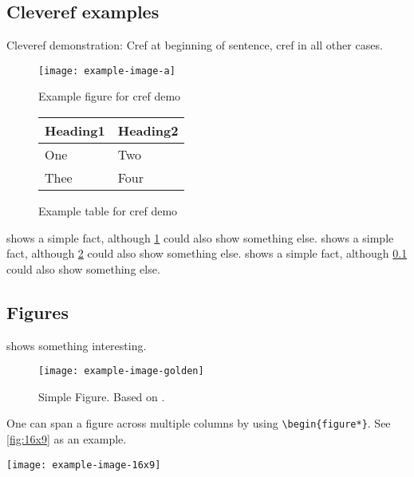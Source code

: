 \documentclass[peerreview,a4paper,english]{IEEEtran}[2015/08/26]
\begin{document}
\subsection{Cleveref examples}
\label{sec:ex:cref}
Cleveref demonstration: Cref at beginning of sentence, cref in all other cases.
\begin{figure}
    \centering
    \texttt{[image: example-image-a]}
    \caption{Example figure for cref demo}
    \label{fig:ex:cref}
\end{figure}
\begin{figure}
    \centering
    \begin{tabular}{ll}
      \toprule
      Heading1 & Heading2 \\
      \midrule
      One      & Two      \\
      Thee     & Four     \\
      \bottomrule
    \end{tabular}
    \caption{Example table for cref demo}
    \label{tab:ex:cref}
\end{figure}
\begin{ltgexample}
 shows a simple fact, although \cref{fig:ex:cref} could also show something else.
 shows a simple fact, although \cref{tab:ex:cref} could also show something else.
 shows a simple fact, although \cref{sec:ex:cref} could also show something else.
\end{ltgexample}
\subsection{Figures}
\begin{ltgexample}
 shows something interesting.
\begin{figure}
  \centering
  \texttt{[image: example-image-golden]}
  \caption[Simple Figure]{Simple Figure. Based on \citet{mwe}.}
  \label{fig:label}
\end{figure}
\end{ltgexample}
One can span a figure across multiple columns by using \verb+\begin{figure*}+.
See \cref{fig:16x9} as an example.
\begin{ltgexample}
\begin{figure*}
  \centering
  \texttt{[image: example-image-16x9]}
  \caption{16x9 Figure}
  \label{fig:16x9}
\end{figure*}
\end{ltgexample}
\end{document}
